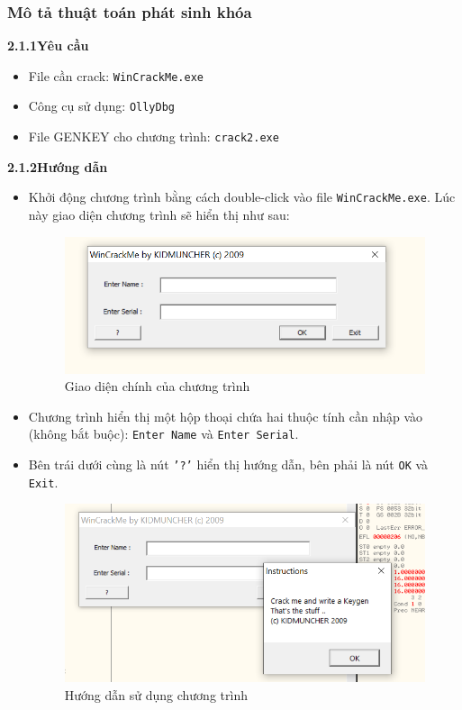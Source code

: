\subsubsection{Mô tả thuật toán phát sinh khóa}

\noindent\textbf{2.1.1\quad Yêu cầu}
\begin{itemize}
    \item File cần crack: \texttt{WinCrackMe.exe}
    \item Công cụ sử dụng: \texttt{OllyDbg}
    \item File GENKEY cho chương trình: \texttt{crack2.exe}
\end{itemize}

\noindent\textbf{2.1.2\quad Hướng dẫn}
\begin{itemize}
    \item Khởi động chương trình bằng cách double-click vào file \texttt{WinCrackMe.exe}. Lúc này giao diện chương trình sẽ hiển thị như sau:
    \begin{figure}[H]
        \centering
        \includegraphics[width=\textwidth]{img/file-2/demo1.PNG}
        \caption{Giao diện chính của chương trình}
        \label{fig:main_interface}
    \end{figure}
    
    \item Chương trình hiển thị một hộp thoại chứa hai thuộc tính cần nhập vào (không bắt buộc): \texttt{Enter Name} và \texttt{Enter Serial}. 
    \item Bên trái dưới cùng là nút \texttt{'?'} hiển thị hướng dẫn, bên phải là nút \texttt{OK} và \texttt{Exit}.
    \begin{figure}[H]
        \centering
        \includegraphics[width=\textwidth]{img/file-2/demo2.PNG}
        \caption{Hướng dẫn sử dụng chương trình}
    \end{figure}


\end{itemize}
